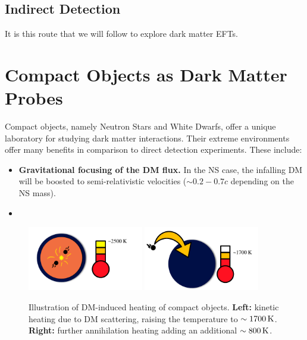 \subsection{Indirect Detection}


It is this route that we will follow to explore dark matter EFTs.

\section{Compact Objects as Dark Matter Probes}


Compact objects, namely Neutron Stars and White Dwarfs, offer a unique
laboratory for studying dark matter interactions. Their extreme environments
offer many benefits in comparison to direct detection experiments. 
These include:

\begin{itemize}
\item \textbf{Gravitational focusing of the DM flux.} In the NS case, the 
infalling DM will be boosted to semi-relativistic velocities ($\sim 0.2 - 0.7 c$
depending on the NS mass).
\item 
\end{itemize}


\begin{figure}
    \centering
    \includegraphics[width=0.45\textwidth]{img/chapter_1/ann_heat_NS.pdf}
    \includegraphics[width=0.45\textwidth]{img/chapter_1/kin_heat_NS.pdf}
    \caption{Illustration of DM-induced heating of compact objects. \textbf{Left:} kinetic heating due to DM scattering, raising the temperature to $\sim 1700 {\rm \,K}$. \textbf{Right:} further annihilation heating adding an additional $\sim 800{\rm \,K}$.}
    \label{fig:cartoon_NS_heat}
\end{figure}




